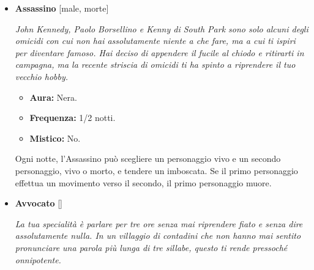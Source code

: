 \documentclass[a4paper,10pt]{article}
\begin{document}
\begin{itemize}
            \begin{multicols}{3}
                  \begin{itemize}
                        \item \textbf{Aura:} Bianca.
                        \item \textbf{Frequenza:} 1/notte.
                        \item \textbf{Mistico:} No.
                  \end{itemize}
            \end{multicols}

            Ogni notte, l'Alcolista può scegliere un personaggio, vivo o morto, e ubriacarsi sotto casa sua. L'abilità dell'Alcolista non ha effetto.

      \item \textbf{Assassino} [male, morte]

            \emph{John Kennedy, Paolo Borsellino e Kenny di South Park sono solo alcuni degli omicidi con cui non hai assolutamente niente a che fare, ma a cui ti ispiri per diventare famoso. Hai deciso di appendere il fucile al chiodo e ritirarti in campagna, ma la recente striscia di omicidi ti ha spinto a riprendere il tuo vecchio hobby.}

            \begin{multicols}{3}
                  \begin{itemize}
                        \item \textbf{Aura:} Nera.
                        \item \textbf{Frequenza:} 1/2 notti.
                        \item \textbf{Mistico:} No.
                  \end{itemize}
            \end{multicols}

            Ogni notte, l'Assassino può scegliere un personaggio vivo e un secondo personaggio, vivo o morto, e tendere un imboscata. Se il primo personaggio effettua un movimento verso il secondo, il primo personaggio muore.

      \item \textbf{Avvocato} []

            \emph{La tua specialità è parlare per tre ore senza mai riprendere fiato e senza dire assolutamente nulla. In un villaggio di contadini che non hanno mai sentito pronunciare una parola più lunga di tre sillabe, questo ti rende pressoché onnipotente.}


\end{itemize}
\end{document}
